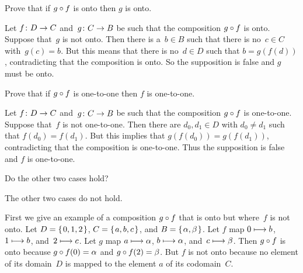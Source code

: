 \documentclass{test}  %
\begin{document}
\begin{problem} 
\begin{exes}
\begin{exercise} 
  Prove that if $g\mathbin{\circ} f$ is onto then $g$ is onto.
\end{exercise}
\begin{answer}
  Let $\mbox{$f\colon D\to C$}$ and~$\mbox{$g\colon C\to B$}$ be such that 
  the composition $g\mathbin{\circ} f$ is onto.
  Suppose that~$g$ is not onto.
  Then there is a~$b\in B$ such that there is no~$c\in C$
  with~$g(c)=b$.
  But this means that there is no~$d\in D$ such that 
  $b=g(f(d))$, contradicting that the composition is onto.
  So the supposition is false and $g$ must be onto.  
\end{answer}
\begin{exercise} 
  Prove that if $g\mathbin{\circ} f$ is one-to-one then $f$ is one-to-one.
\end{exercise}
\begin{answer}
  Let $\mbox{$f\colon D\to C$}$ and~$\mbox{$g\colon C\to B$}$ be such that 
  the composition $g\mathbin{\circ} f$ is one-to-one.
  Suppose that~$f$ is not one-to-one.
  Then there are $d_0,d_1\in D$ with $d_0\neq d_1$ such that $f(d_0)=f(d_1)$.
  But this implies that $g(f(d_0))=g(f(d_1))$, contradicting that 
  the composition is one-to-one.
  Thus the supposition is false and $f$ is one-to-one.  
\end{answer}
\begin{exercise} 
  Do the other two cases hold? 
\end{exercise}
\begin{answer}
  The other two cases do not hold.
  
  First we give an example of a composition $g\mathbin{\circ} f$ that is onto
  but where~$f$ is not onto.   
  Let $D=\mbox{$\{\hspace{0.1em}0,1,2\hspace{0.1em}\}$}$, $C=\mbox{$\{\hspace{0.1em}a,b,c\hspace{0.1em}\}$}$, and $B=\mbox{$\{\hspace{0.1em}\alpha, \beta\hspace{0.1em}\}$}$.
  Let $f$ map $0\stackrel{}{\longmapsto} b$, $1\stackrel{}{\longmapsto}b$, and~$2\stackrel{}{\longmapsto} c$.
  Let $g$ map $a\stackrel{}{\longmapsto} \alpha$, $b\stackrel{}{\longmapsto}\alpha$, 
  and~$c\stackrel{}{\longmapsto} \beta$. 
  Then $g\mathbin{\circ} f$ is onto because $g\mathbin{\circ} f(0)=\alpha$ and
  $g\mathbin{\circ} f(2)=\beta$.
  But $f$ is not onto because no element of its domain~$D$ is mapped to the
  element $a$ of its codomain~$C$. 


\end{answer}
\end{exes}
\end{problem}
\end{document}
